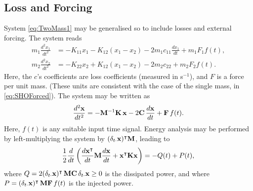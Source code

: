 \documentclass[11pt,twoside,a4paper,english]{book}
\newcommand{\dtd}{\delta_{t\cdot}}
\begin{document}
\subsection{Loss and Forcing}

System \eqref{eq:TwoMass1} may be generalised so to include losses and external forcing. The system reads
\begin{subequations}\label{eq:TwoMass2}
\begin{align}
m_1 \frac{d^2 x_1}{dt^2} &= -K_{11}x_1 - K_{12}(x_1 - x_2) -2m_1c_{11}\frac{dx_{1}}{dt} + m_1 F_1 f(t), \label{eq:TwoMass2a} \\
m_2 \frac{d^2 x_2}{dt^2} &= -K_{22}x_2 + K_{12}(x_1 - x_2) - 2m_2 c_{22} + m_2 F_2 f(t) . \label{eq:TwoMass2b}
\end{align}
\end{subequations}
Here, the $c$'s coefficients are loss coefficients (measured in s$^{-1}$), and $F$ is a force per unit mass. (These units are consistent with the case of the single mass, in \eqref{eq:SHOForced}). The system may be written as
\begin{equation}\label{eq:tempTwoModes1}
\frac{d^2{\bf x}}{dt^2} = -{\bf M}^{-1}{\bf K} \, {\bf x} - 2 {\bf C} \, \frac{d{\bf x}}{dt} + {\bf F}\, f(t).
\end{equation}
Here, $f(t)$ is any suitable input time signal. Energy analysis may be performed by left-multiplying the system by $(\dtd {\bf x})^\intercal {\bf M}$, leading to
\begin{equation}
\frac{1}{2}\frac{d}{dt}\left(\frac{d{\bf x}^\intercal}{dt} {\bf M} \frac{d{\bf x}}{dt} + {\bf x}^\intercal {\bf K} {\bf x}\right) = -Q(t) + P(t),
\end{equation}
where $Q = 2(\dtd {\bf x})^\intercal \,{\bf M}{\bf C} \, \dtd {\bf x} \geq 0$ is the dissipated power, and where $P = (\dtd {\bf x})^\intercal \, {\bf M}{\bf F} \, f(t)$ is the injected power.
\end{document}
